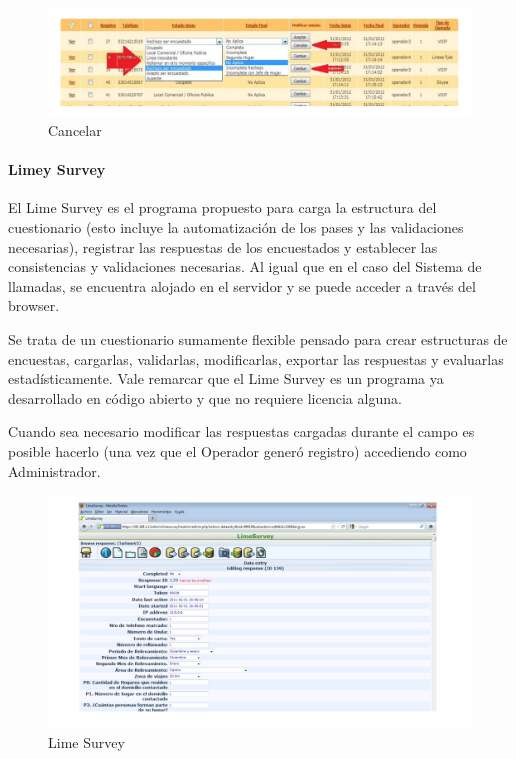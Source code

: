 \documentclass[
  openany]{book}
\begin{document}
\begin{figure}

{\centering \includegraphics[width=1\linewidth]{imagenes/figura6-09} 

}

\caption{Cancelar}\label{fig:Canc}
\end{figure}

\hypertarget{limey-survey}{%
\paragraph{Limey Survey}\label{limey-survey}}

El Lime Survey es el programa propuesto para carga la estructura del cuestionario (esto incluye la automatización de los pases y las validaciones necesarias), registrar las respuestas de los encuestados y establecer las consistencias y validaciones necesarias. Al igual que en el caso del Sistema de llamadas, se encuentra alojado en el servidor y se puede acceder a través del browser.

Se trata de un cuestionario sumamente flexible pensado para crear estructuras de encuestas, cargarlas, validarlas, modificarlas, exportar las respuestas y evaluarlas estadísticamente. Vale remarcar que el Lime Survey es un programa ya desarrollado en código abierto y que no requiere licencia alguna.

Cuando sea necesario modificar las respuestas cargadas durante el campo es posible hacerlo (una vez que el Operador generó registro) accediendo como Administrador.

\begin{figure}

{\centering \includegraphics[width=1\linewidth]{imagenes/figura6-10} 

}

\caption{Lime Survey}\label{fig:Lime}
\end{figure}
\end{document}

